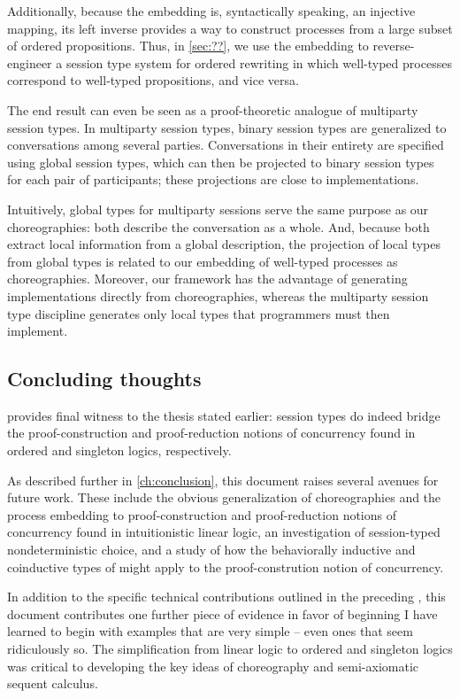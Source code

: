 Additionally, because the embedding is, syntactically speaking, an injective mapping, its left inverse provides a way to construct processes from a large subset of ordered propositions.
Thus, in \cref{sec:??}, we use the embedding to reverse-engineer a session type system for ordered rewriting in which well-typed processes correspond to well-typed propositions, and vice versa.

The end result can even be seen as a proof-theoretic analogue of multiparty session types.\autocite{Honda+:POPL08}
In multiparty session types, binary session types are generalized to conversations among several parties.
Conversations in their entirety are specified using global session types, which can then be projected to binary session types for each pair of participants; these projections are close to implementations.

Intuitively, global types for multiparty sessions serve the same purpose as our choreographies: both describe the conversation as a whole.
And, because both extract local information from a global description, the projection of local types from global types is related to our embedding of well-typed processes as choreographies.
Moreover, our framework has the advantage of generating implementations directly from choreographies, whereas the multiparty session type discipline generates only local types that programmers must then implement.


\subsection{Concluding thoughts}

 provides final witness to the thesis stated earlier:
session types do indeed bridge the proof-construction and proof-reduction notions of concurrency found in ordered and singleton logics, respectively.

As described further in \cref{ch:conclusion}, this document raises several avenues for future work.
These include the obvious generalization of choreographies and the process embedding to proof-construction and proof-reduction notions of concurrency found in intuitionistic linear logic, an investigation of session-typed nondeterministic choice, and a study of how the behaviorally inductive and coinductive types of \textcite{Derakhshan+Pfenning:LMCS20} might apply to the proof-constrution notion of concurrency.


In addition to the specific technical contributions outlined in the preceding , this document contributes one further piece of evidence in favor of beginning 
I have learned to begin with examples that are very simple -- even ones that seem ridiculously so.
The simplification from linear logic to ordered and singleton logics was critical to developing the key ideas of choreography and semi-axiomatic sequent calculus.




